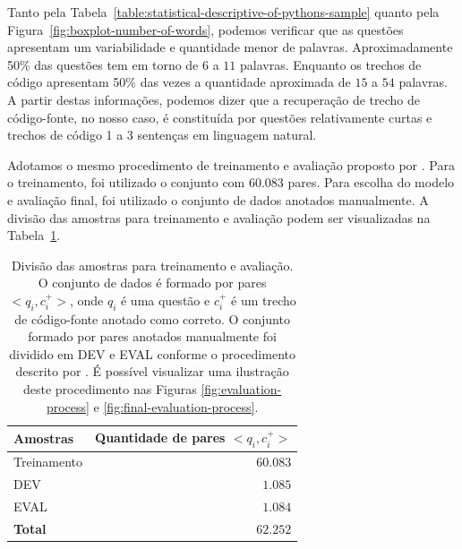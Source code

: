 Tanto pela Tabela~\ref{table:statistical-descriptive-of-pythons-sample} quanto pela Figura~\ref{fig:boxplot-number-of-words}, podemos verificar que as questões apresentam um variabilidade e quantidade menor de palavras. Aproximadamente 50\% das questões tem em torno de $6$ a $11$ palavras. Enquanto os trechos de código apresentam 50\% das vezes a quantidade aproximada de $15$ a $54$ palavras. A partir destas informações, podemos dizer que a recuperação de trecho de código-fonte, no nosso caso, é constituída por questões relativamente curtas e trechos de código 1 a 3 sentenças em linguagem natural. 

Adotamos o mesmo procedimento de treinamento e avaliação proposto por \cite{iyer-etal-2016-summarizing}. Para o treinamento, foi utilizado o conjunto com $60.083$ pares. Para escolha do modelo e avaliação final, foi utilizado o conjunto de dados anotados manualmente. A divisão das amostras para treinamento e avaliação podem ser visualizadas na Tabela~\ref{table:divisao-amostras}. 

\begin{table}[h]
\centering
\begin{tabular}{ p{3cm} r  }
 \hline
 \textbf{Amostras} & \textbf{Quantidade de pares $<q_{i}, c_{i}^{+}>$}\\
 \hline
 Treinamento & $60.083$\\
 
 DEV & $1.085$ \\
 
 EVAL & $1.084$\\
 \hline
 \textbf{Total} & $\bm{62.252}$\\
 \hline
\end{tabular}
\caption{Divisão das amostras para treinamento e avaliação. O conjunto de dados é formado por pares $<q_{i}, c_{i}^{+}>$, onde $q_{i}$ é uma questão e $c_{i}^{+}$ é um trecho de código-fonte anotado como correto. O conjunto formado por pares anotados manualmente foi dividido em DEV e EVAL conforme o procedimento descrito por \cite{iyer-etal-2016-summarizing}. É possível visualizar uma ilustração deste procedimento nas Figuras \ref{fig:evaluation-process} e \ref{fig:final-evaluation-process}.}
\label{table:divisao-amostras}
\end{table}



